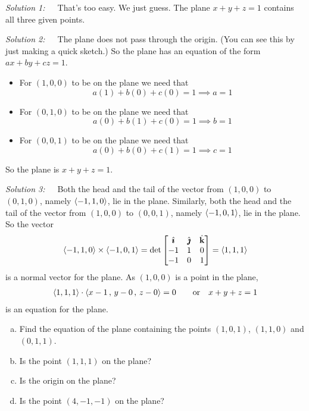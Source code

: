 \begin{solution}
\emph{Solution 1:}\ \ \ That's too easy. We just guess.
The plane $x+y+z=1$ contains all three given points.

\emph{Solution 2:}\ \ \ The plane does not pass through the origin.
(You can see this by just making a quick sketch.) So the plane has an equation
of the form $ax+by+cz=1$. 
\begin{itemize}
\item For $(1,0,0)$ to be on the plane we need that
\begin{equation*}
a(1) +b(0) +c(0) =1
\implies a=1
\end{equation*}
\item For $(0,1,0)$ to be on the plane we need that
\begin{equation*}
a(0) +b(1) +c(0) =1
\implies b=1
\end{equation*}
\item For $(0,0,1)$ to be on the plane we need that
\begin{equation*}
a(0) +b(0) +c(1) =1
\implies c=1
\end{equation*}
\end{itemize}
So the plane is $x+y+z=1$.

\emph{Solution 3:}\ \ \ 
Both the head and the tail of the vector from $(1,0,0)$ to $(0,1,0)$,
namely $\left< -1,1,0\right>$, lie in the plane. Similarly, 
both the head and the tail of the vector from $(1,0,0)$ to $(0,0,1)$,
namely $\left< -1,0,1\right>$, lie in the plane. So the vector
\begin{align*}
\left< -1,1,0\right> \times \left< -1,0,1\right>
=\det\left[\begin{matrix}
           \hat{\pmb{\imath}} & \hat{\pmb{\jmath}} & \hat{\mathbf{k}} \\
           -1  &  1  &  0 \\
           -1  &  0  &  1
  \end{matrix}\right]
=\left< 1 , 1 ,1  \right>
\end{align*}
is a normal vector for the plane. As $(1,0,0)$ is a point in the plane,
\begin{align*}
\left< 1 , 1 ,1 \right> \cdot \left< x-1\,,\,y-0\,,\, z-0 \right> = 0\qquad
\text{or}\quad
x+y+z=1
\end{align*}
is an equation for the plane.

\end{solution}


\begin{question}
\begin{enumerate}[(a)]
\item
Find the equation of the plane containing the points $(1,0,1)$,
$(1,1,0)$ and $(0,1,1)$.
\item
Is the point $(1,1,1)$ on the plane?
\item
Is the origin on the plane?
\item
Is the point $(4,-1,-1)$ on the plane?
\end{enumerate}
\end{question}


